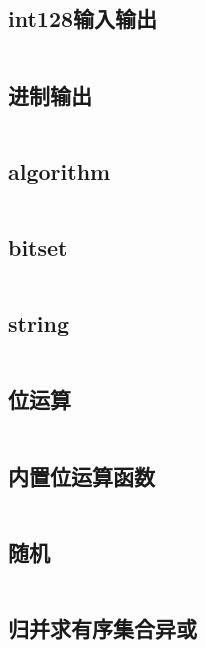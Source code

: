 \subsection{int128输入输出} 

\inputminted{cpp}{code/int128.cc}

\subsection{进制输出} 

\inputminted{cpp}{code/进制输出.cc}

\subsection{algorithm} 

\inputminted{cpp}{code/algorithm库.cc}

\subsection{bitset} 

\inputminted{text}{code/bitset.txt}

\subsection{string} 

\inputminted{cpp}{code/string.cc}

\subsection{位运算} 

\inputminted{cpp}{code/bitOperation.cc}

\subsection{内置位运算函数} 

\inputminted{text}{code/builtinBitFunction.txt}

\subsection{随机} 

\inputminted{cpp}{code/random.cc}

\subsection{归并求有序集合异或} 

